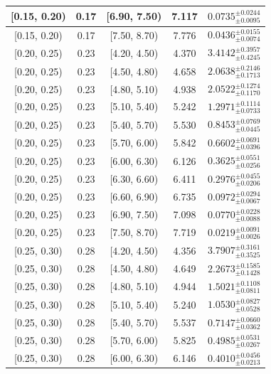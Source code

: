 \begin{longtable}{|c|c|c|c|c|}
\hline
[0.15, 0.20) & 0.17 & [6.90, 7.50) & 7.117 & $0.0735^{ \pm 0.0244 }_{ \pm 0.0095 }$ \\ 
\hline
[0.15, 0.20) & 0.17 & [7.50, 8.70) & 7.776 & $0.0436^{ \pm 0.0155 }_{ \pm 0.0074 }$ \\ 
\hline
[0.20, 0.25) & 0.23 & [4.20, 4.50) & 4.370 & $3.4142^{ \pm 0.3957 }_{ \pm 0.4245 }$ \\ 
\hline
[0.20, 0.25) & 0.23 & [4.50, 4.80) & 4.658 & $2.0638^{ \pm 0.2146 }_{ \pm 0.1713 }$ \\ 
\hline
[0.20, 0.25) & 0.23 & [4.80, 5.10) & 4.938 & $2.0522^{ \pm 0.1274 }_{ \pm 0.1170 }$ \\ 
\hline
[0.20, 0.25) & 0.23 & [5.10, 5.40) & 5.242 & $1.2971^{ \pm 0.1114 }_{ \pm 0.0733 }$ \\ 
\hline
[0.20, 0.25) & 0.23 & [5.40, 5.70) & 5.530 & $0.8453^{ \pm 0.0769 }_{ \pm 0.0445 }$ \\ 
\hline
[0.20, 0.25) & 0.23 & [5.70, 6.00) & 5.842 & $0.6602^{ \pm 0.0691 }_{ \pm 0.0396 }$ \\ 
\hline
[0.20, 0.25) & 0.23 & [6.00, 6.30) & 6.126 & $0.3625^{ \pm 0.0551 }_{ \pm 0.0256 }$ \\ 
\hline
[0.20, 0.25) & 0.23 & [6.30, 6.60) & 6.411 & $0.2976^{ \pm 0.0455 }_{ \pm 0.0206 }$ \\ 
\hline
[0.20, 0.25) & 0.23 & [6.60, 6.90) & 6.735 & $0.0972^{ \pm 0.0294 }_{ \pm 0.0067 }$ \\ 
\hline
[0.20, 0.25) & 0.23 & [6.90, 7.50) & 7.098 & $0.0770^{ \pm 0.0228 }_{ \pm 0.0088 }$ \\ 
\hline
[0.20, 0.25) & 0.23 & [7.50, 8.70) & 7.719 & $0.0219^{ \pm 0.0091 }_{ \pm 0.0026 }$ \\ 
\hline
[0.25, 0.30) & 0.28 & [4.20, 4.50) & 4.356 & $3.7907^{ \pm 0.3161 }_{ \pm 0.3525 }$ \\ 
\hline
[0.25, 0.30) & 0.28 & [4.50, 4.80) & 4.649 & $2.2673^{ \pm 0.1585 }_{ \pm 0.1428 }$ \\ 
\hline
[0.25, 0.30) & 0.28 & [4.80, 5.10) & 4.944 & $1.5021^{ \pm 0.1108 }_{ \pm 0.0811 }$ \\ 
\hline
[0.25, 0.30) & 0.28 & [5.10, 5.40) & 5.240 & $1.0530^{ \pm 0.0827 }_{ \pm 0.0528 }$ \\ 
\hline
[0.25, 0.30) & 0.28 & [5.40, 5.70) & 5.537 & $0.7147^{ \pm 0.0660 }_{ \pm 0.0362 }$ \\ 
\hline
[0.25, 0.30) & 0.28 & [5.70, 6.00) & 5.825 & $0.4985^{ \pm 0.0531 }_{ \pm 0.0267 }$ \\ 
\hline
[0.25, 0.30) & 0.28 & [6.00, 6.30) & 6.146 & $0.4010^{ \pm 0.0456 }_{ \pm 0.0213 }$ \\ 

\end{longtable}
